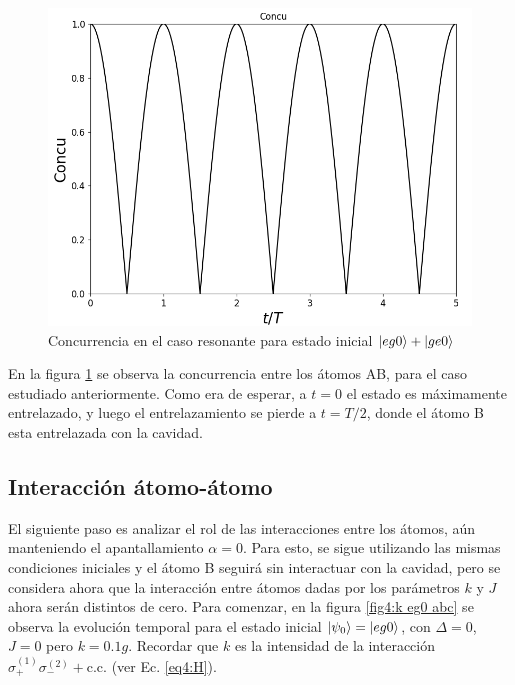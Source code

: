 \begin{figure}[H]
    \begin{minipage}[c]{0.67\textwidth}
        \includegraphics[width=\textwidth]{figuras/ch4/d eg0+ concu d=0.png}
    \end{minipage}\hfill
    \begin{minipage}[c]{0.3\textwidth}
    \caption{Concurrencia en el caso resonante para estado inicial $\ket{eg0}+\ket{ge0}$} 
    \label{fig4:concu eg0 sim}
  \end{minipage}
\end{figure}
En la figura \ref{fig4:concu eg0 sim} se observa la concurrencia entre los átomos AB, para el caso estudiado anteriormente. Como era de esperar, a $t=0$ el estado es máximamente entrelazado, y luego el entrelazamiento se pierde a $t=T/2$, donde el átomo B esta entrelazada con la cavidad. 

\subsection{Interacción átomo-átomo}

El siguiente paso es analizar el rol de las interacciones entre los átomos, aún manteniendo el apantallamiento $\alpha=0$. Para esto, se sigue utilizando las mismas condiciones iniciales y el átomo B seguirá sin interactuar con la cavidad, pero se considera ahora que la interacción entre átomos dadas por los parámetros $k$ y $J$ ahora serán distintos de cero. Para comenzar, en la figura \ref{fig4:k eg0 abc} se observa la evolución temporal para el estado inicial $\ket{\psi_0}=\ket{eg0}$, con $\Delta = 0$, $J=0$ pero $k=0.1g$. Recordar que $k$ es la intensidad de la interacción $\sigma^{(1)}_+\sigma^{(2)}_-+\text{c.c.}$ (ver Ec. \ref{eq4:H}).


